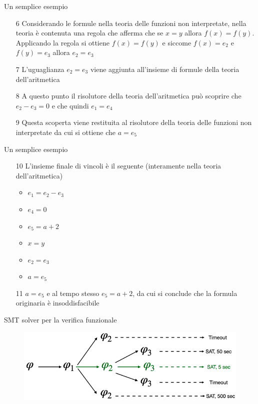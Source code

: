 \documentclass[]{beamer}
\begin{document}
\begin{frame}{Un semplice esempio}
\begin{example}
    \begin{enumerate}
        \item[6] Considerando le formule nella teoria delle funzioni non interpretate, nella teoria è contenuta una regola che afferma che se $x=y$ allora $f(x)=f(y)$. Applicando la regola si ottiene  $f(x)=f(y)$ e siccome $f(x)=e_2$ e $f(y)=e_3$ allora $e_2=e_3$
        \item[7] L'uguaglianza $e_2=e_3$ viene aggiunta all'insieme di formule della teoria dell'aritmetica
        \item[8] A questo punto il risolutore della teoria dell'aritmetica può scoprire che $e_2-e_3=0$ e che quindi $e_1=e_4$
        \item[9] Questa scoperta viene restituita al risolutore della teoria delle funzioni non interpretate da cui si ottiene che $a=e_5$
    \end{enumerate}
\end{example}
\end{frame}

\begin{frame}{Un semplice esempio}
\begin{example}
 \begin{enumerate}
        \item[10] L'insieme finale di vincoli è il seguente (interamente nella teoria dell'aritmetica)\begin{itemize}
            \item $e_1=e_2-e_3$
            \item $e_4=0$
            \item $e_5=a+2$
            \item $x=y$
            \item $e_2=e_3$
            \item $a=e_5$
        \end{itemize}
        \item[11] $a=e_5$ e al tempo stesso $e_5=a+2$, da cui si conclude che la formula originaria è insoddisfacibile
    \end{enumerate}
\end{example}
\end{frame}

\begin{frame}{SMT solver per la verifica funzionale}
    \begin{figure}
        \centering
        \includegraphics[scale=0.45]{assets/img/search_space.png}
    \end{figure}
\end{frame}
\end{document}

